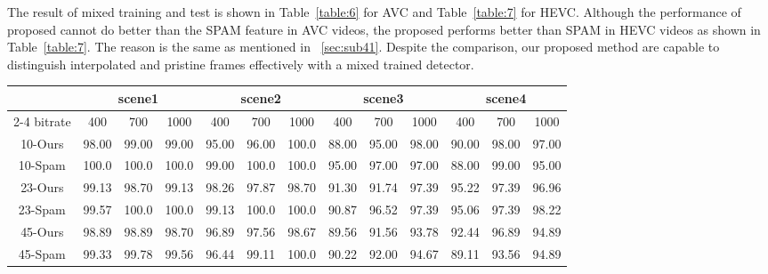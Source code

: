 \documentclass[pdftex,twocolumn,epjc3]{svjour3}          %
\begin{document}
The result of mixed training and test is shown in Table~\ref{table:6} for AVC and Table~\ref{table:7} for HEVC. Although the performance of proposed cannot do better than the SPAM feature in AVC videos, the proposed performs better than SPAM in HEVC videos as shown in Table~\ref{table:7}. The reason is the same as mentioned in ~\ref{sec:sub41}. Despite the comparison, our proposed method are capable to distinguish interpolated and pristine frames effectively with a mixed trained detector.

\begin{table*}[b]
\renewcommand\arraystretch{1.5}
    \caption{Mixed training and test in H.264/AVC videos(\%).}\label{table:6}
    \begin{center}
        \begin{tabular*}{14.5cm}{ccccccccccccc}
            \hline
            \ & \multicolumn{3}{c}{scene1} & \multicolumn{3}{c}{scene2} & \multicolumn{3}{c}{scene3} &\multicolumn{3}{c}{scene4} \\ \cline{2-4}\cline{5-7}\cline{8-10}\cline{11-13}
            bitrate & 400 & 700 & 1000 & 400 & 700 & 1000 & 400 & 700 & 1000 & 400 & 700 & 1000 \\ \hline
            10-Ours & 98.00 & 99.00 & 99.00 & 95.00 & 96.00 & 100.0 & 88.00 & 95.00 & 98.00 & 90.00 & 98.00 & 97.00 \\
            10-Spam & 100.0 & 100.0 & 100.0 & 99.00 & 100.0 & 100.0 & 95.00 & 97.00 & 97.00 & 88.00 & 99.00 & 95.00 \\ \hline
            23-Ours & 99.13 & 98.70 & 99.13 & 98.26 & 97.87 & 98.70 & 91.30 & 91.74 & 97.39 & 95.22 & 97.39 & 96.96 \\
            23-Spam & 99.57 & 100.0 & 100.0 & 99.13 & 100.0 & 100.0 & 90.87 & 96.52 & 97.39 & 95.06 & 97.39 & 98.22 \\ \hline
            45-Ours & 98.89 & 98.89 & 98.70 & 96.89 & 97.56 & 98.67 & 89.56 & 91.56 & 93.78 & 92.44 & 96.89 & 94.89\\
            45-Spam & 99.33 & 99.78 & 99.56 & 96.44 & 99.11 & 100.0 & 90.22 & 92.00 & 94.67 & 89.11 & 93.56 & 94.89
            \\ \hline
        \end{tabular*}
    \end{center}
\end{table*}
\end{document}
